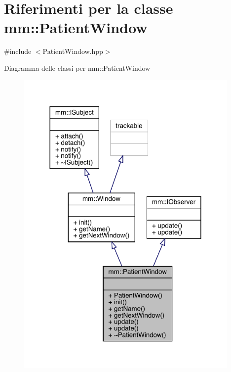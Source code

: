 \hypertarget{classmm_1_1_patient_window}{}\section{Riferimenti per la classe mm\+:\+:Patient\+Window}
\label{classmm_1_1_patient_window}


{\ttfamily \#include $<$Patient\+Window.\+hpp$>$}



Diagramma delle classi per mm\+:\+:Patient\+Window
\nopagebreak
\begin{figure}[H]
\begin{center}
\leavevmode
\includegraphics[width=309pt]{d9/d55/classmm_1_1_patient_window__inherit__graph}
\end{center}
\end{figure}


